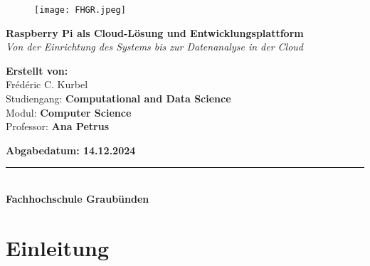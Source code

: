 \documentclass[a4paper,12pt]{article}
\begin{document}

\begin{figure}[t]
    \centering
    \texttt{[image: FHGR.jpeg]} %
\end{figure}

\vspace{2cm}

\begin{center}
    {\Huge \textbf{Raspberry Pi als Cloud-Lösung und Entwicklungsplattform}} \\[1.0em]
    {\Large \textit{Von der Einrichtung des Systems bis zur Datenanalyse in der Cloud}} \\
\end{center}

\vspace{3cm}

\begin{center}
    \textbf{Erstellt von:} \\[0.5em]
    {\Large Frédéric C. Kurbel} \\[1.5em]
    
    Studiengang: \textbf{Computational and Data Science} \\[1.5em]
    
    Modul: \textbf{Computer Science} \\[0.5em]
    Professor: \textbf{Ana Petrus} \\
\end{center}

\vspace{3cm}

\begin{center}
    \textbf{Abgabedatum: 14.12.2024} \\
\end{center}

\vfill

\begin{center}
    \rule{0.8\textwidth}{0.5pt} \\[0.5em]
    \textbf{Fachhochschule Graubünden}
\end{center}

\renewcommand{\contentsname}{Inhaltsverzeichnis}

\tableofcontents
\newpage

\section{Einleitung}
\end{document}
